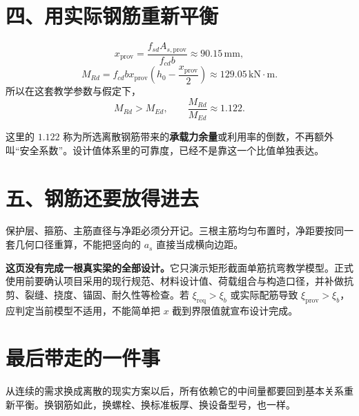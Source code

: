 \documentclass[11pt,a4paper]{ctexart}
\begin{document}
\section*{四、用实际钢筋重新平衡}

\[
x_{\mathrm{prov}}
=\frac{f_{sd}A_{s,\mathrm{prov}}}{f_{cd}b}
\approx90.15\,\mathrm{mm},
\]
\[
M_{Rd}
=f_{cd}b x_{\mathrm{prov}}
\left(h_0-\frac{x_{\mathrm{prov}}}{2}\right)
\approx129.05\,\mathrm{kN\!\cdot\!m}.
\]
所以在这套教学参数与假定下，
\[
M_{Rd}>M_{Ed},
\qquad
\frac{M_{Rd}}{M_{Ed}}\approx1.122.
\]

这里的 $1.122$ 称为所选离散钢筋带来的\textbf{承载力余量}或利用率的倒数，不再额外叫“安全系数”。设计值体系里的可靠度，已经不是靠这一个比值单独表达。

\section*{五、钢筋还要放得进去}

\begin{center}
\end{center}

保护层、箍筋、主筋直径与净距必须分开记。三根主筋均匀布置时，净距要按同一套几何口径重算，不能把竖向的 $a_s$ 直接当成横向边距。

\begin{boundarybox}
\textbf{这页没有完成一根真实梁的全部设计。}它只演示矩形截面单筋抗弯教学模型。正式使用前要确认项目采用的现行规范、材料设计值、荷载组合与构造口径，并补做抗剪、裂缝、挠度、锚固、耐久性等检查。若 $\xi_{\mathrm{req}}>\xi_b$ 或实际配筋导致 $\xi_{\mathrm{prov}}>\xi_b$，应判定当前模型不适用，不能简单把 $x$ 截到界限值就宣布设计完成。
\end{boundarybox}

\section*{最后带走的一件事}

从连续的需求换成离散的现实方案以后，所有依赖它的中间量都要回到基本关系重新平衡。换钢筋如此，换螺栓、换标准板厚、换设备型号，也一样。
\end{document}
